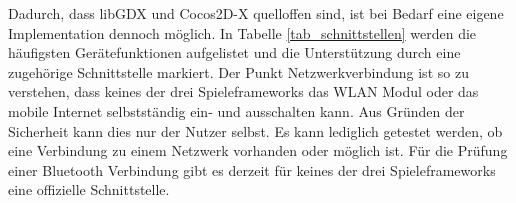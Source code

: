 Dadurch, dass libGDX und Cocos2D-X quelloffen sind, ist bei Bedarf eine eigene Implementation dennoch möglich. In Tabelle \ref{tab_schnittstellen} werden die häufigsten Gerätefunktionen aufgelistet und die Unterstützung durch eine zugehörige Schnittstelle markiert. Der Punkt Netzwerkverbindung  ist so zu verstehen, dass keines der drei Spieleframeworks das WLAN Modul oder das mobile Internet selbstständig ein- und ausschalten kann. Aus Gründen der Sicherheit kann dies nur der Nutzer selbst. Es kann lediglich getestet werden, ob eine Verbindung zu einem Netzwerk vorhanden oder möglich ist. Für die Prüfung einer Bluetooth Verbindung gibt es derzeit für keines der drei Spieleframeworks eine offizielle Schnittstelle.

\begin{table}[htbp]
	\centering
\end{table}
